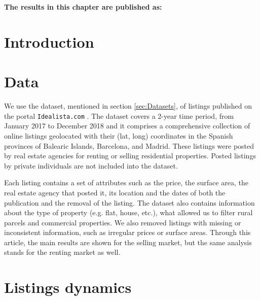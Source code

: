 \vspace{-1.5cm}
\small
\textbf{The results in this chapter are published as:}
\vspace{0.05 cm}

\normalsize
\vspace{0.5 cm}

\section{Introduction}

\section{Data}

We use the dataset, mentioned in section \ref{sec:Datasets}, of listings published on the portal \texttt{Idealista.com} \cite{idealista}. The dataset covers a 2-year time period, from January 2017 to December 2018 and it comprises a comprehensive collection of online listings geolocated with their (lat, long) coordinates in the Spanish provinces of Balearic Islands, Barcelona, and Madrid. These listings were posted by real estate agencies for renting or selling residential properties. Posted listings by private individuals are not included into the dataset.

Each listing contains a set of attributes such as the price, the surface area, the real estate agency that posted it, its location and the dates of both the publication and the removal of the listing. The dataset also contains information about the type of property (e.g. flat, house, etc.), what allowed us to filter rural parcels and commercial properties. We also removed listings with missing or inconsistent information, such as irregular prices or surface areas. Through this article, the main results are shown for the selling market, but the same analysis stands for the renting market as well.

\section{Listings dynamics}

